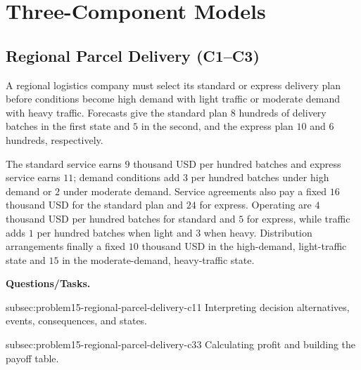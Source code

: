 	\section{Three-Component Models}
	\label{sec:three-component-models}


	\subsection{Regional Parcel Delivery (C1--C3)}
	\label{sec:problem15-regional-parcel-delivery-c1-c3}

	A regional logistics company must select its standard or express delivery plan before conditions become high demand with light traffic or moderate demand with heavy traffic. Forecasts give the standard plan \(8\) hundreds of delivery batches in the first state and \(5\) in the second, and the express plan \(10\) and \(6\) hundreds, respectively.

	The standard service earns \(9\) thousand USD per hundred batches and express service earns \(11\); demand conditions add \(3\) per hundred batches under high demand or \(2\) under moderate demand. Service agreements also pay a fixed \(16\) thousand USD for the standard plan and \(24\) for express. Operating  are \(4\) thousand USD per hundred batches for standard and \(5\) for express, while traffic adds \(1\) per hundred batches when light and \(3\) when heavy. Distribution arrangements finally  a fixed \(10\) thousand USD in the high-demand, light-traffic state and \(15\) in the moderate-demand, heavy-traffic state.

	\textbf{Questions/Tasks.}
	\begin{enumerate}
		\CriterionTask
		{subsec:problem15-regional-parcel-delivery-c1}{1}
		{Interpreting decision alternatives, events, consequences, and states.}

		\CriterionTask
		{subsec:problem15-regional-parcel-delivery-c3}{3}
		{Calculating profit and building the payoff table.}
	\end{enumerate}

